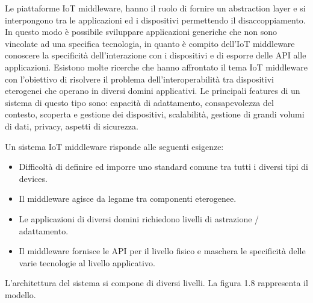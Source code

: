 \documentclass[12pt,a4paper,openright,twoside]{report}
\begin{document}
Le piattaforme IoT middleware,  hanno il ruolo di fornire un abstraction layer e si interpongono tra le applicazioni ed i dispositivi permettendo il disaccoppiamento.
In questo modo \`e possibile sviluppare applicazioni generiche che non sono vincolate ad una specifica tecnologia, in quanto \`e compito dell'IoT middleware conoscere la specificit\`a dell'interazione con i dispositivi e di esporre delle API alle applicazioni.
Esistono molte ricerche che hanno affrontato il tema IoT middleware con l'obiettivo di risolvere il problema dell'interoperabilit\`a tra dispositivi eterogenei che operano in diversi domini applicativi. 
Le principali features di un sistema di questo tipo sono: capacit\`a di adattamento, consapevolezza del contesto, scoperta e gestione dei dispositivi, scalabilit\`a, gestione di grandi volumi di dati, privacy, aspetti di sicurezza. 

Un sistema IoT middleware risponde alle seguenti esigenze:
\begin{itemize}                       
\item Difficolt\`a di definire ed imporre uno standard comune tra tutti i diversi tipi di devices.
\item Il middleware agisce da legame tra componenti eterogenee.
\item Le applicazioni di diversi domini richiedono livelli di astrazione / adattamento.
\item Il middleware fornisce le API per il livello fisico e maschera le specificit\`a delle varie tecnologie al livello applicativo.
\end{itemize}
L'architettura del sistema si compone di diversi livelli. La figura 1.8 rappresenta il modello.
\end{document}
